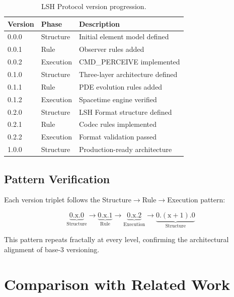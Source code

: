 \documentclass{article}
\begin{document}
\begin{table}[h]
\centering
\caption{LSH Protocol version progression.}
\label{tab:lsh-history}
\begin{tabular}{llp{6cm}}
\toprule
\textbf{Version} & \textbf{Phase} & \textbf{Description} \\
\midrule
0.0.0 & Structure & Initial element model defined \\
0.0.1 & Rule & Observer rules added \\
0.0.2 & Execution & CMD\_PERCEIVE implemented \\
0.1.0 & Structure & Three-layer architecture defined \\
0.1.1 & Rule & PDE evolution rules added \\
0.1.2 & Execution & Spacetime engine verified \\
0.2.0 & Structure & LSH Format structure defined \\
0.2.1 & Rule & Codec rules implemented \\
0.2.2 & Execution & Format validation passed \\
1.0.0 & Structure & Production-ready architecture \\
\bottomrule
\end{tabular}
\end{table}

\subsection{Pattern Verification}

Each version triplet follows the Structure$\to$Rule$\to$Execution pattern:

\begin{equation}
\label{eq:pattern}
\underbrace{0.\text{x}.0}_{\text{Structure}} \to \underbrace{0.\text{x}.1}_{\text{Rule}} \to \underbrace{0.\text{x}.2}_{\text{Execution}} \to \underbrace{0.(\text{x}+1).0}_{\text{Structure}}
\end{equation}

This pattern repeats fractally at every level, confirming the architectural alignment of base-3 versioning.

\section{Comparison with Related Work}
\end{document}
